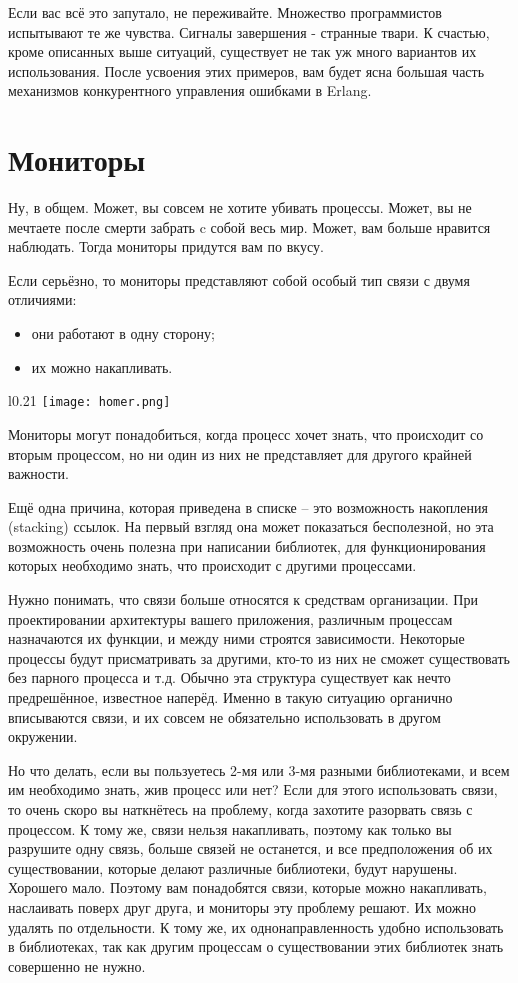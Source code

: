 Если вас всё это запутало, не переживайте.
Множество программистов испытывают те же чувства.
Сигналы завершения \-- странные твари.
К счастью, кроме описанных выше ситуаций, существует не так уж много вариантов их использования.
После усвоения этих примеров, вам будет ясна большая часть механизмов конкурентного управления ошибками в Erlang.
\section{Мониторы}
\label{monitors}
Ну, в общем.
Может, вы совсем не хотите убивать процессы.
Может, вы не мечтаете после смерти забрать c собой весь мир.
Может, вам больше нравится наблюдать.
Тогда мониторы придутся вам по вкусу.

Если серьёзно, то мониторы представляют собой особый тип связи с двумя отличиями:
\begin{itemize}
    \item они работают в одну сторону;
    \item их можно накапливать.
\end{itemize}

\begin{wrapfigure}{l}{0.21\linewidth}
    \texttt{[image: homer.png]}
\end{wrapfigure}

Мониторы могут понадобиться, когда процесс хочет знать, что происходит со вторым процессом, но ни один из них не представляет для другого крайней важности.

Ещё одна причина, которая приведена в списке \--- это возможность накопления (stacking) ссылок.
На первый взгляд она может показаться бесполезной, но эта возможность очень полезна при написании библиотек, для функционирования которых необходимо знать, что происходит с другими процессами.

Нужно понимать, что связи больше относятся к средствам организации.
При проектировании архитектуры вашего приложения, различным процессам назначаются их функции, и между ними строятся зависимости.
Некоторые процессы будут присматривать за другими, кто\--то из них не сможет существовать без парного процесса и т.д.
Обычно эта структура существует как нечто предрешённое, известное наперёд.
Именно в такую ситуацию органично вписываются связи, и их совсем не обязательно использовать в другом окружении.

Но что делать, если вы пользуетесь 2\--мя или 3\--мя разными библиотеками, и всем им необходимо знать, жив процесс или нет?
Если для этого использовать связи, то очень скоро вы наткнётесь на проблему, когда захотите разорвать связь с процессом.
К тому же, связи нельзя накапливать, поэтому как только вы разрушите одну связь, больше связей не останется, и все предположения об их существовании, которые делают различные библиотеки, будут нарушены.
Хорошего мало.
Поэтому вам понадобятся связи, которые можно накапливать, наслаивать поверх друг друга, и мониторы эту проблему решают.
Их можно удалять по отдельности.
К тому же, их однонаправленность удобно использовать в библиотеках, так как другим процессам о существовании этих библиотек знать совершенно не нужно.

